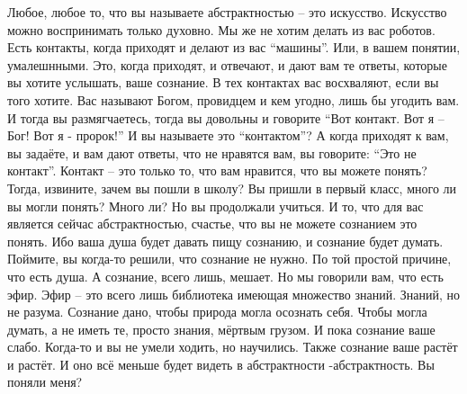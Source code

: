 Любое, любое то, что вы называете абстрактностью – это искусство. Искусство можно воспринимать только духовно. Мы же не хотим делать из вас роботов. Есть контакты, когда приходят и делают из вас ``машины''. Или, в вашем понятии, умалешнными. Это, когда  приходят, и отвечают, и дают вам те ответы, которые вы хотите услышать, ваше сознание. В тех контактах вас восхваляют, если вы того хотите. Вас называют Богом, провидцем и кем угодно, лишь бы угодить вам. И тогда вы размягчаетесь, тогда вы довольны и говорите ``Вот контакт. Вот я – Бог! Вот я - пророк!'' И вы называете это ``контактом''? А когда приходят к вам, вы задаёте, и вам дают ответы, что не нравятся вам,  вы говорите: ``Это не контакт''. Контакт – это только то, что вам нравится, что вы можете понять? Тогда, извините, зачем вы пошли в школу? Вы пришли в первый класс, много ли вы могли понять? Много ли? Но вы продолжали учиться. И то, что для вас является сейчас абстрактностью, счастье, что вы не можете сознанием это понять. Ибо ваша душа будет давать пищу сознанию, и сознание будет думать. Поймите, вы когда-то решили, что сознание не нужно. По той простой причине, что есть душа. А сознание, всего лишь, мешает. Но мы говорили вам, что есть эфир. Эфир – это всего лишь библиотека имеющая множество знаний. Знаний, но не разума. Сознание дано, чтобы природа могла осознать себя. Чтобы могла думать, а не иметь те, просто знания, мёртвым грузом. И пока сознание ваше слабо. Когда-то и вы не умели ходить, но научились. Также сознание ваше растёт и растёт. И оно всё меньше будет видеть в абстрактности -абстрактность. Вы поняли меня? 
